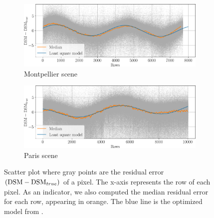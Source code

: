 \begin{figure}
    \begin{subfigure}[t]{\linewidth}
        \centering
        \includegraphics[width=\linewidth]{Images/Chap_6/vibration_bias_Montpellier.png}
        \caption{Montpellier scene}
        \label{fig:vibration_bias_Montpellier}
    \end{subfigure}
    \begin{subfigure}[t]{\linewidth}
        \centering
        \includegraphics[width=\linewidth]{Images/Chap_6/vibration_bias_Paris.png}
        \caption{Paris scene}
        \label{fig:vibration_bias_Paris}
    \end{subfigure}
    \caption{Scatter plot where gray points are the residual error $(\mathrm{DSM}-\mathrm{DSM}_{true})$ of a pixel. The x-axis represents the row of each pixel. As an indicator, we also computed the median residual error for each row, appearing in orange. The blue line is the optimized model from .}
    \label{fig:vibration_bias}
\end{figure}

